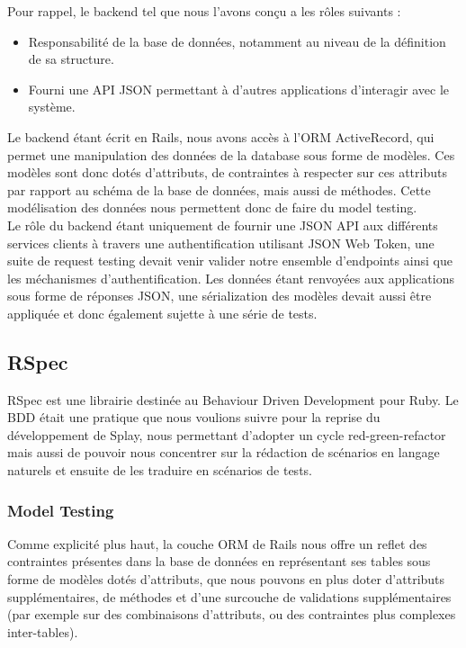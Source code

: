 \documentclass{eplmastersthesis}
\begin{document}
      Pour rappel, le backend tel que nous l'avons conçu a les rôles suivants :
      \begin{itemize}
        \item Responsabilité de la base de données, notamment au niveau de
        la définition de sa structure.
        \item Fourni une API JSON permettant à d'autres applications d'interagir
        avec le système.
      \end{itemize}

      Le backend étant écrit en Rails, nous avons accès à l'ORM ActiveRecord, qui
      permet une manipulation des données de la database sous forme de modèles.
      Ces modèles sont donc dotés d'attributs, de contraintes à respecter sur
      ces attributs par rapport au schéma de la base de données, mais aussi de
      méthodes. Cette modélisation des données nous permettent donc de faire
      du model testing.\\

      Le rôle du backend étant uniquement de fournir une JSON API
      aux différents services clients à travers une authentification utilisant
      JSON Web Token, une suite de request testing devait venir valider
      notre ensemble d'endpoints ainsi que les méchanismes d'authentification.
      Les données étant renvoyées aux applications sous forme de réponses
      JSON, une sérialization des modèles devait aussi être appliquée et donc
      également sujette à une série de tests.

      \subsection{RSpec}

        RSpec est une librairie destinée au Behaviour Driven Development
        pour Ruby. Le BDD était une pratique que nous voulions suivre pour
        la reprise du développement de Splay, nous permettant d'adopter
        un cycle red-green-refactor mais aussi de pouvoir nous concentrer sur
        la rédaction de scénarios en langage naturels et ensuite de les
        traduire en scénarios de tests.

        \subsubsection{Model Testing}

          Comme explicité plus haut, la couche ORM de Rails nous offre un
          reflet des contraintes présentes dans la base de données en représentant
          ses tables sous forme de modèles dotés d'attributs, que nous pouvons en
          plus doter d'attributs supplémentaires, de méthodes et d'une surcouche
          de validations supplémentaires (par exemple sur des combinaisons d'attributs,
          ou des contraintes plus complexes inter-tables).\\
\end{document}

